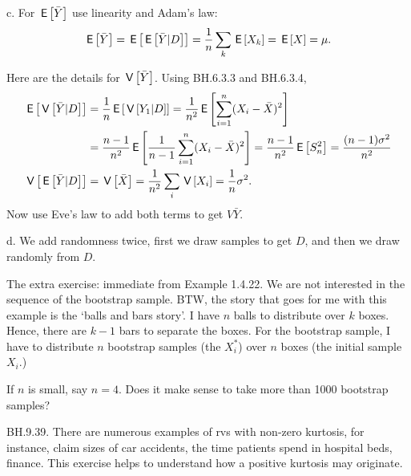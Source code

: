 \begin{exercise}
\begin{solution}
c. For $\,\mathsf{E}\left[\bar Y\right]$ use linearity and Adam's law:
\begin{align*}
\,\mathsf{E}\left[\bar Y\right] = \,\mathsf{E}\left[\,\mathsf{E}\left[\bar Y|D\right]\right] = \frac 1 n \sum_{k}\,\mathsf{E}\left[X_{k}\right] = \,\mathsf{E}\left[X\right] = \mu.
\end{align*}


Here are the details for $\,\mathsf{V}\left[\bar Y\right]$. Using  BH.6.3.3 and BH.6.3.4,
\begin{align*}
\,\mathsf{E}\left[\,\mathsf{V}\left[\bar Y|D\right]\right] &=  \frac 1 n \,\mathsf{E}\left[\,\mathsf{V}\left[Y_{1}|D\right]\right] =
\frac 1 {n^2} \,\mathsf{E}\left[ \sum_{i=1}^n (X_i-\bar X)^2\right] \\
&= \frac{n-1} {n^2} \,\mathsf{E}\left[\frac 1 {n-1} \sum_{i=1}^n (X_i-\bar X)^2\right]
= \frac{n-1} {n^2} \,\mathsf{E}\left[S_{n}^2\right] = \frac{(n-1)\sigma^{2}} {n^2} \\
\,\mathsf{V}\left[\,\mathsf{E}\left[\bar Y|D\right]\right] &= \,\mathsf{V}\left[\bar X\right]= \frac 1{n^{2}} \sum_{i} \,\mathsf{V}\left[X_{i}\right] = \frac 1 n \sigma^{2}.
\end{align*}
Now use Eve's law to add both terms to get $V{\bar Y}$.


d. We add randomness twice, first we draw  samples to get $D$, and then we draw randomly from $D$.

The extra exercise: immediate from Example 1.4.22. We are not interested in the sequence of the bootstrap sample. BTW, the story that goes for me with this example is the `balls and bars story'. I have $n$ balls to distribute over $k$ boxes. Hence, there are $k-1$ bars to separate the boxes. For the bootstrap sample, I have to distribute $n$ bootstrap samples (the $X^*_{i}$) over $n$ boxes (the initial sample $X_i$.)

If $n$ is small, say $n=4$. Does it make sense to take more than 1000 bootstrap samples?
\end{solution}
\end{exercise}

\setcounter{theorem}{38}
\begin{exercise}
BH.9.39. There are numerous examples of rvs with  non-zero kurtosis, for instance,  claim sizes of car accidents, the time patients spend in hospital beds, finance. This exercise helps to understand how a positive kurtosis may originate.
\end{exercise}


